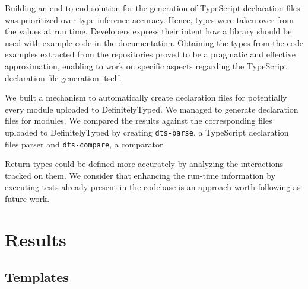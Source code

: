 \documentclass[sigplan,screen]{acmart}
\begin{document}
Building an end-to-end solution for the generation of TypeScript declaration files was
prioritized over type inference accuracy. Hence, types were taken over from the
values at run time. Developers express their intent how a library should be used with
example code in the documentation. 
Obtaining the types from the code examples extracted from the repositories proved to be a
pragmatic and effective approximation, enabling to work on specific aspects regarding the
TypeScript declaration file generation itself.

We built a mechanism to automatically create declaration files for potentially every
module uploaded to DefinitelyTyped. We managed to generate declaration files for
\CountModulesGeneratedDeclarationFile{} modules. We compared the results against the corresponding 
files uploaded to
DefinitelyTyped by creating \texttt{dts-parse}, a TypeScript declaration files parser and
\texttt{dts-compare}, a comparator.

Return types could be defined more accurately by analyzing the interactions tracked on
them. We consider that enhancing the run-time information by executing tests already
present in the codebase is an approach worth following as future work.



\clearpage
\appendix
\section{Results}
\subsection{Templates}
\label{sec:appendix-results-templates}
\end{document}
